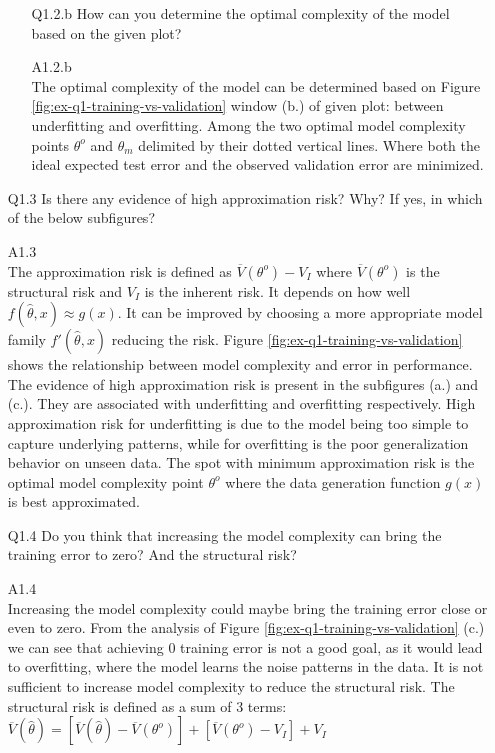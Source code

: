 \documentclass[unicode, 11pt, a4paper]{scrartcl}
\begin{document}
\begin{itemize}
\begin{itemize}
		      \item[Q1.2.b] How can you determine the optimal complexity of the model based on the given plot?

		      \item[A1.2.b] ~\\
		            The optimal complexity of the model can be determined based on
		            Figure \ref{fig:ex-q1-training-vs-validation}
		            window (b.) of given plot: between underfitting and overfitting.
		            Among the two optimal model complexity points $\theta^o$ and $\theta_m$ delimited by their
		            dotted vertical lines.
		            Where both the ideal expected test error and the observed validation error are minimized.
	      \end{itemize}

	\item[Q1.3] Is there any evidence of high approximation risk? Why?
	      If yes, in which of the below subfigures?

	\item[A1.3] ~\\
	      The approximation risk is defined as $\overline{V}(\theta^o) - V_I$
	      where $\overline{V}(\theta^o)$ is the structural risk
	      and $V_I$ is the inherent risk.
	      It depends on how well $f(\hat{\theta}, x) \approx g(x)$.
	      It can be improved by choosing a more appropriate model family $f'(\hat{\theta}, x)$
	      reducing the risk.
	      Figure \ref{fig:ex-q1-training-vs-validation} shows the relationship between
	      model complexity and error in performance.
	      The evidence of high approximation risk is present in the subfigures (a.) and (c.).
	      They are associated with underfitting and overfitting respectively.
	      High approximation risk for underfitting is due to the model
	      being too simple to capture underlying patterns,
	      while for overfitting is the poor generalization behavior on unseen data.
	      The spot with minimum approximation risk is the optimal model complexity point $\theta^o$
	      where the data generation function $g(x)$ is best approximated.

	\item[Q1.4] Do you think that increasing the model complexity can bring the training error to zero?
	      And the structural risk?

	\item[A1.4] ~\\
	      Increasing the model complexity could maybe bring the training error close or even to zero.
	      From the analysis of Figure \ref{fig:ex-q1-training-vs-validation} (c.) we can see that
	      achieving 0 training error is not a good goal, as it would lead to overfitting,
	      where the model learns the noise patterns in the data.
	      It is not sufficient to increase model complexity to reduce the structural risk. \newline
	      The structural risk is defined as a sum of 3 terms: \newline
	      $\overline{V}(\hat{\theta}) = [\overline{V}(\hat{\theta}) - \overline{V}(\theta^o)]
		      + [\overline{V}(\theta^o) - V_I]
		      + V_I$


\end{itemize}
\end{document}
